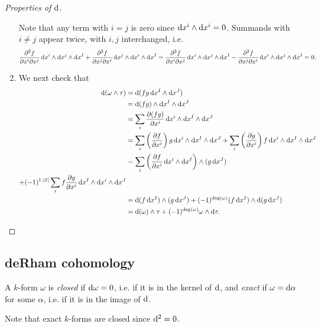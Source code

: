 \begin{proof}[Properties of $\mathop{}\!\mathrm{d}$]
\begin{enumerate}
{      Note that any term with $i = j$ is zero since
      $\mathop{}\!\mathrm{d} x^i \wedge \mathop{}\!\mathrm{d} x^i = 0$. Summands with $i \neq j$
      appear twice, with $i, j$ interchanged, i.e.
      $$
        \frac{\partial^2 f}
             {\partial x^i \partial x^j}
           \dif x^i \wedge \dif x^j \wedge \dif x^I
      + \frac{\partial^2 f}
             {\partial x^j \partial x^i}
           \dif x^j \wedge \dif x^i \wedge \dif x^I
      = \frac{\partial^2 f}
             {\partial x^i \partial x^j}
           \dif x^i \wedge \dif x^j \wedge \dif x^I
      - \frac{\partial^2 f}
             {\partial x^j \partial x^i}
           \dif x^i \wedge \dif x^j \wedge \dif x^I
      = 0.
      $$
    }
    \item{
      We next check that
      \begin{align*}
         \dif (\omega \wedge \tau)
      &= \dif (f g \dif x^I \wedge \dif x^J) \\
      &= \dif (f g) \wedge \dif x^I \wedge \dif x^J \\
      &= \sum_i
            \frac{\partial (fg)}
                 {\partial x^i}
            \dif x^i \wedge \dif x^I \wedge \dif x^J \\
      &= \sum_i
            \left(
              \frac{\partial f}
                   {\partial x^i}
            \right)
            g
            \dif x^i \wedge \dif x^I \wedge \dif x^J
       + \sum_i
            \left(
              \frac{\partial g}
                   {\partial x^i}
            \right)
            f
            \dif x^i \wedge \dif x^I \wedge \dif x^J \\
      &= \sum_i
           \left(
             \frac{\partial f}
                  {\partial x^i}
             \dif x^i \wedge \dif x^I
           \right)
           \wedge (g \dif x^J) \\
       + (-1)^{1 \cdot |I|}
           \sum_i
             f \frac{\partial g}{\partial x^i}
             \dif x^I \wedge \dif x^i \wedge \dif x^J \\
      &= \dif (f \dif x^I) \wedge (g \dif x^J)
       + (-1)^{\deg(\omega)} (f \dif x^I) \wedge \dif(g \dif x^J) \\
      &= \dif (\omega) \wedge \tau
       + (-1)^{\deg(\omega)} \omega \wedge \dif \tau.
      \end{align*}
    }
  \end{enumerate}
\end{proof}

\subsection{deRham cohomology}
\begin{defn}
A $k$-form $\omega$ is \emph{closed} if
$\mathop{}\!\mathrm{d} \omega = 0$, i.e. if it is in the kernel of
$\mathop{}\!\mathrm{d}$, and \emph{exact} if
$\omega = \mathop{}\!\mathrm{d} \alpha$ for some $\alpha$, i.e. if it is in the image
of $\mathop{}\!\mathrm{d}$.
\end{defn}
Note that exact $k$-forms are closed since $\mathop{}\!\mathrm{d}^2 = 0$.

